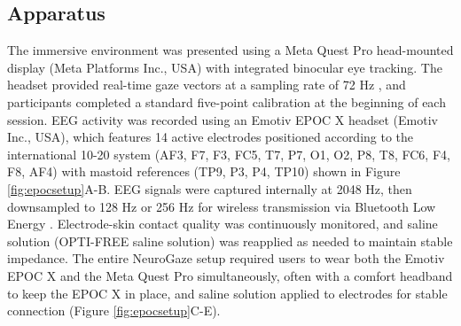\documentclass[utf8]{FrontiersinHarvard} %
\begin{document}

\subsection{Apparatus}
The immersive environment was presented using a Meta Quest Pro head-mounted display (Meta Platforms Inc., USA) with integrated binocular eye tracking. The headset provided real-time gaze vectors at a sampling rate of 72 Hz \citep{hou}, and participants completed a standard five-point calibration at the beginning of each session. EEG activity was recorded using an Emotiv EPOC X headset (Emotiv Inc., USA), which features 14 active electrodes positioned according to the international 10-20 system \citep{khazi2012eeg} (AF3, F7, F3, FC5, T7, P7, O1, O2, P8, T8, FC6, F4, F8, AF4) with mastoid references (TP9, P3, P4, TP10) shown in Figure \ref{fig:epocsetup}A-B. EEG signals were captured internally at 2048 Hz, then downsampled to 128 Hz or 256 Hz for wireless transmission via Bluetooth Low Energy \citep{emotiv2020epocx}. Electrode-skin contact quality was continuously monitored, and saline solution (OPTI-FREE saline solution) was reapplied as needed to maintain stable impedance. The entire NeuroGaze setup required users to wear both the Emotiv EPOC X and the Meta Quest Pro simultaneously, often with a comfort headband to keep the EPOC X in place, and saline solution applied to electrodes for stable connection (Figure \ref{fig:epocsetup}C-E).
\end{document}
